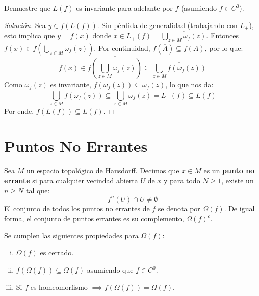 \begin{ejercicio}
	Demuestre que $L(f)$ es invariante para adelante por $f$ (asumiendo $f \in C^0$).
\end{ejercicio}
\begin{proof}[Solución]
	Sea $y \in f(L(f))$. Sin pérdida de generalidad (trabajando con $L_+$), esto implica que $y = f(x)$ donde $x \in L_+(f) = \overline{\bigcup_{z \in M} \omega_f(z)}$.
	Entonces $f(x) \in f\left(\overline{\bigcup_{z \in M} \omega_f(z)}\right)$. Por continuidad, $f(\overline{A}) \subseteq \overline{f(A)}$, por lo que:
	$$f(x) \in \overline{f\left(\bigcup_{z \in M} \omega_f(z)\right)} \subseteq \overline{\bigcup_{z \in M} f(\omega_f(z))}$$
	Como $\omega_f(z)$ es invariante, $f(\omega_f(z)) \subseteq \omega_f(z)$, lo que nos da:
	$$\overline{\bigcup_{z \in M} f(\omega_f(z))} \subseteq \overline{\bigcup_{z \in M} \omega_f(z)} = L_+(f) \subseteq L(f)$$
	Por ende, $f(L(f)) \subseteq L(f)$.
\end{proof}

\section{Puntos No Errantes}

\begin{definicion}
	Sea $M$ un espacio topológico de Hausdorff. Decimos que $x \in M$ es un \textbf{punto no errante} si para cualquier vecindad abierta $U$ de $x$ y para todo $N \ge 1$, existe un $n \ge N$ tal que:
	$$f^n(U) \cap U \neq \emptyset$$
	El conjunto de todos los puntos no errantes de $f$ se denota por $\Omega(f)$. De igual forma, el conjunto de puntos errantes es su complemento, $\Omega(f)^c$.
\end{definicion}

\begin{proposicion}
	Se cumplen las siguientes propiedades para $\Omega(f)$:
	\begin{enumerate}[i)]
		\item $\Omega(f)$ es cerrado.
		\item $f(\Omega(f)) \subseteq \Omega(f)$ asumiendo que $f \in C^0$.
		\item Si $f$ es homeomorfismo $\implies f(\Omega(f)) = \Omega(f)$.
	\end{enumerate}
\end{proposicion}

